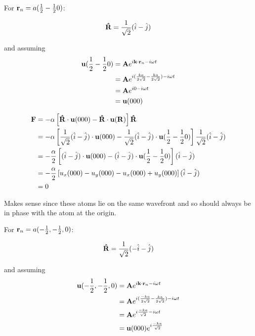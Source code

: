 \documentclass{article}
\begin{document}
For $\mathbf{r}_n = a({1\over
  2}-{1\over 2}0)$:

\begin{equation}
  \mathbf{\hat{R}} = {1\over \sqrt{2}} (\hat{i} - \hat{j})
  \end{equation}

and  assuming
\begin{align}
  \mathbf{u}({1\over  2}-{1\over 2}0) &= \mathbf{A}e^{i \mathbf{k} \cdot \mathbf{r}_n - i \omega t}\\
  &= \mathbf{A}e^{i ({k a\over 2 \sqrt{2}} -{k a\over 2 \sqrt{2}} ) - i \omega t}\\
  &= \mathbf{A}e^{i 0 - i \omega t}\\
  &= \mathbf{u}(000) \\
  \end{align}

\begin{align}
  \mathbf{F} &= - \alpha \left[ \mathbf{\hat{R}}\cdot \mathbf{u}(000) -
  \mathbf{\hat{R}}\cdot
  \mathbf{u}(\mathbf{R})\right]\mathbf{\hat{R}}\\
  &=- \alpha \left[ {1\over \sqrt{2}} (\hat{i} - \hat{j}) \cdot
    \mathbf{u}(000) - {1\over \sqrt{2}} (\hat{i} - \hat{j}) \cdot
    \mathbf{u}({1\over 2}-{1\over 2}0)\right]{1\over \sqrt{2}}(\hat{i}
    - \hat{j})\\
  &=- {\alpha\over 2} \left[ (\hat{i} - \hat{j}) \cdot
    \mathbf{u}(000) - (\hat{i} - \hat{j}) \cdot
    \mathbf{u}({1\over 2}-{1\over 2}0)\right](\hat{i}
    - \hat{j})\\
  &=- {\alpha\over 2} \left[u_x(000) - u_y(000) - u_x(000) + u_y(000) \right](\hat{i}
    - \hat{j}) \\
&=0\\\end{align}

Makes sense since these atoms lie on the same wavefront and so should
always be in phase with the atom at the origin.

For $\mathbf{r}_n = a(-{1\over
  2},-{1\over 2},0)$:

\begin{equation}
  \mathbf{\hat{R}} = {1\over \sqrt{2}} (-\hat{i} - \hat{j})
  \end{equation}

and  assuming
\begin{align}
  \mathbf{u}(-{1\over  2},-{1\over 2},0) &= \mathbf{A}e^{i \mathbf{k} \cdot \mathbf{r}_n - i \omega t}\\
  &= \mathbf{A}e^{i ({-k a\over 2 \sqrt{2}} -{k a\over 2 \sqrt{2}} ) - i \omega t}\\
  &= \mathbf{A}e^{i {-k a\over \sqrt{2}} - i \omega t}\\
  &= \mathbf{u}(000) e^{i {-k a\over \sqrt{2}}} \\
  \end{align}
\end{document}
